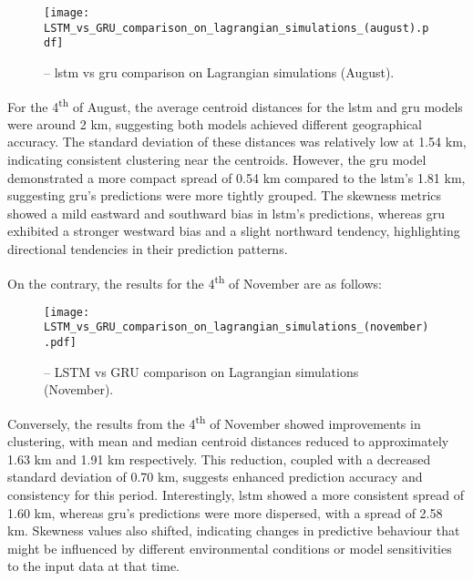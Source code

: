 \begin{figure}[H]
    \centering
    \texttt{[image: LSTM\_vs\_GRU\_comparison\_on\_lagrangian\_simulations\_(august).pdf]}
    \caption[LSTM vs GRU comparison on Lagrangian simulations (August).]{-- \acrshort{lstm} vs \acrshort{gru} comparison on Lagrangian simulations (August).\label{fig_4.6}}
\end{figure}

For the 4\textsuperscript{th} of August, the average centroid distances for the \acrshort{lstm} and \acrshort{gru} models were around 2 km, suggesting both models achieved different geographical accuracy. The standard deviation of these distances was relatively low at 1.54 km, indicating consistent clustering near the centroids. However, the \acrshort{gru} model demonstrated a more compact spread of 0.54 km compared to the \acrshort{lstm}'s 1.81 km, suggesting \acrshort{gru}'s predictions were more tightly grouped. The skewness metrics showed a mild eastward and southward bias in \acrshort{lstm}'s predictions, whereas \acrshort{gru} exhibited a stronger westward bias and a slight northward tendency, highlighting directional tendencies in their prediction patterns.\newline

\noindent On the contrary, the results for the 4\textsuperscript{th} of November are as follows:

\begin{figure}[htbp]
    \centering
    \texttt{[image: LSTM\_vs\_GRU\_comparison\_on\_lagrangian\_simulations\_(november).pdf]}
    \caption[LSTM vs GRU comparison on Lagrangian simulations (November).]{-- LSTM vs GRU comparison on Lagrangian simulations (November).\label{fig_4.7}}
\end{figure}

Conversely, the results from the 4\textsuperscript{th} of November showed improvements in clustering, with mean and median centroid distances reduced to approximately 1.63 km and 1.91 km respectively. This reduction, coupled with a decreased standard deviation of 0.70 km, suggests enhanced prediction accuracy and consistency for this period. Interestingly, \acrshort{lstm} showed a more consistent spread of 1.60 km, whereas \acrshort{gru}’s predictions were more dispersed, with a spread of 2.58 km. Skewness values also shifted, indicating changes in predictive behaviour that might be influenced by different environmental conditions or model sensitivities to the input data at that time.\newline

